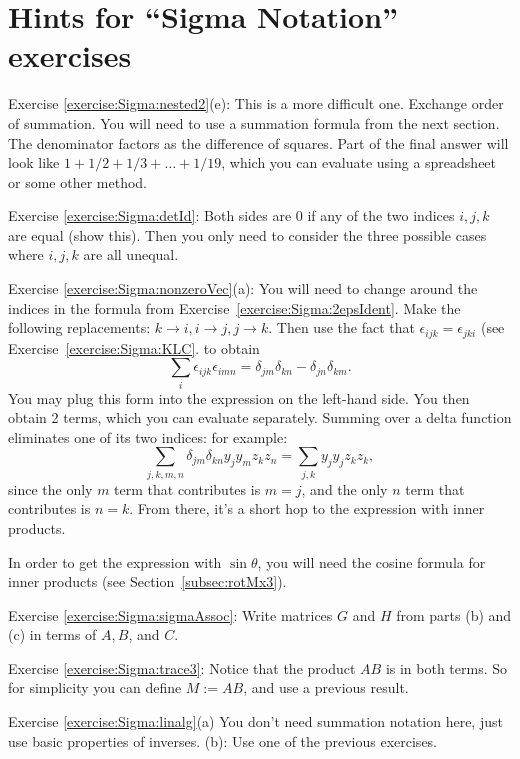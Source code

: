 \section{Hints for ``Sigma Notation'' exercises}\label{sec:sigma:hints} 

\noindent Exercise \ref{exercise:Sigma:nested2}(e): This is a more difficult one.  Exchange order of summation. You will need to use a summation formula from the next section.  The denominator factors as the difference of squares.  Part of the final answer will look like $1 + 1/2 + 1/3 + \ldots + 1/19$, which you can evaluate using a spreadsheet or some other method. 

\noindent Exercise \ref{exercise:Sigma:detId}: Both sides are 0 if any of the two indices $i,j,k$ are equal (show this). Then you only need to consider the three possible cases where $i,j,k$ are all unequal.

\noindent Exercise \ref{exercise:Sigma:nonzeroVec}(a): You will need to change around the indices in the formula from Exercise~\ref{exercise:Sigma:2epsIdent}. Make the following replacements: $k \rightarrow i, i \rightarrow j, j \rightarrow k$.  Then use the fact that $\epsilon_{ijk}= \epsilon_{jki}$ (see Exercise~\ref{exercise:Sigma:KLC}.  to obtain
\[\sum_i \epsilon_{ijk} \epsilon_{imn} = \delta_{jm} \delta_{kn} - \delta_{jn} \delta_{km}. \]
You may plug this form into the expression on the left-hand side. You then obtain 2 terms, which you can evaluate separately. Summing over a delta function eliminates one of its two indices: for example:
\[ \sum_{j,k,m,n} \delta_{jm} \delta_{kn}  y_j y_m z_k z_n  = \sum_{j,k} y_j y_j z_k z_k, \]
since the only $m$ term that contributes is $m=j$, and the only $n$ term that contributes is $n=k$. From there, it's a short hop to the expression with inner products.

In order to get the expression with $\sin \theta$, you will need the cosine formula for inner products (see Section~\ref{subsec:rotMx3}).

\noindent Exercise \ref{exercise:Sigma:sigmaAssoc}: Write matrices $G$ and $H$ from parts (b) and (c) in terms of $A,B$, and $C$.

\noindent Exercise \ref{exercise:Sigma:trace3}: Notice that the product ${AB}$ is in both terms. So for simplicity you can define $M := AB$, and use a previous result.

\noindent Exercise \ref{exercise:Sigma:linalg}(a) You don't need summation notation here, just use basic properties of inverses. (b): Use one of the previous exercises.

